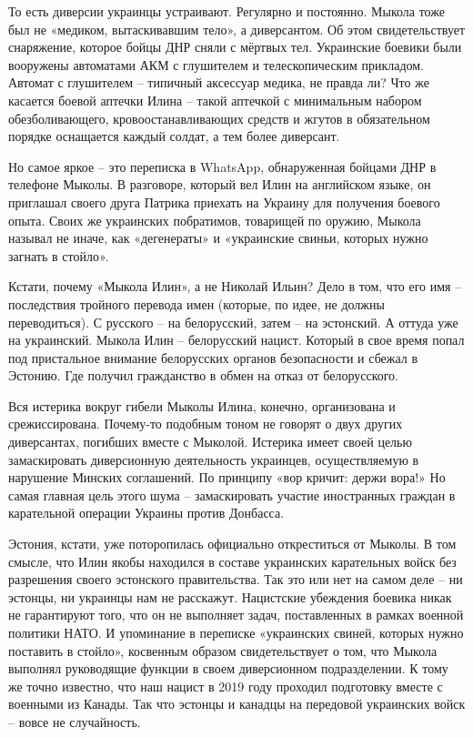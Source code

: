 То есть диверсии украинцы устраивают. Регулярно и постоянно. Мыкола тоже был не
«медиком, вытаскивавшим тело», а диверсантом. Об этом свидетельствует
снаряжение, которое бойцы ДНР сняли с мёртвых тел. Украинские боевики были
вооружены автоматами АКМ с глушителем и телескопическим прикладом. Автомат с
глушителем – типичный аксессуар медика, не правда ли? Что же касается боевой
аптечки Илина – такой аптечкой с минимальным набором обезболивающего,
кровоостанавливающих средств и жгутов в обязательном порядке оснащается каждый
солдат, а тем более диверсант.

Но самое яркое – это переписка в WhatsApp, обнаруженная бойцами ДНР в телефоне
Мыколы. В разговоре, который вел Илин на английском языке, он приглашал своего
друга Патрика приехать на Украину для получения боевого опыта. Своих же
украинских побратимов, товарищей по оружию, Мыкола называл не иначе, как
«дегенераты» и «украинские свиньи, которых нужно загнать в стойло».

Кстати, почему «Мыкола Илин», а не Николай Ильин? Дело в том, что его имя –
последствия тройного перевода имен (которые, по идее, не должны переводиться).
С русского – на белорусский, затем – на эстонский. А оттуда уже на украинский.
Мыкола Илин – белорусский нацист. Который в свое время попал под пристальное
внимание белорусских органов безопасности и сбежал в Эстонию. Где получил
гражданство в обмен на отказ от белорусского.

Вся истерика вокруг гибели Мыколы Илина, конечно, организована и
срежиссирована. Почему-то подобным тоном не говорят о двух других диверсантах,
погибших вместе с Мыколой. Истерика имеет своей целью замаскировать
диверсионную деятельность украинцев, осуществляемую в нарушение Минских
соглашений. По принципу «вор кричит: держи вора!» Но самая главная цель этого
шума – замаскировать участие иностранных граждан в карательной операции Украины
против Донбасса.

Эстония, кстати, уже поторопилась официально откреститься от Мыколы. В том
смысле, что Илин якобы находился в составе украинских карательных войск без
разрешения своего эстонского правительства. Так это или нет на самом деле – ни
эстонцы, ни украинцы нам не расскажут. Нацистские убеждения боевика никак не
гарантируют того, что он не выполняет задач, поставленных в рамках военной
политики НАТО. И упоминание в переписке «украинских свиней, которых нужно
поставить в стойло», косвенным образом свидетельствует о том, что Мыкола
выполнял руководящие функции в своем диверсионном подразделении. К тому же
точно известно, что наш нацист в 2019 году проходил подготовку вместе с
военными из Канады. Так что эстонцы и канадцы на передовой украинских войск –
вовсе не случайность.

